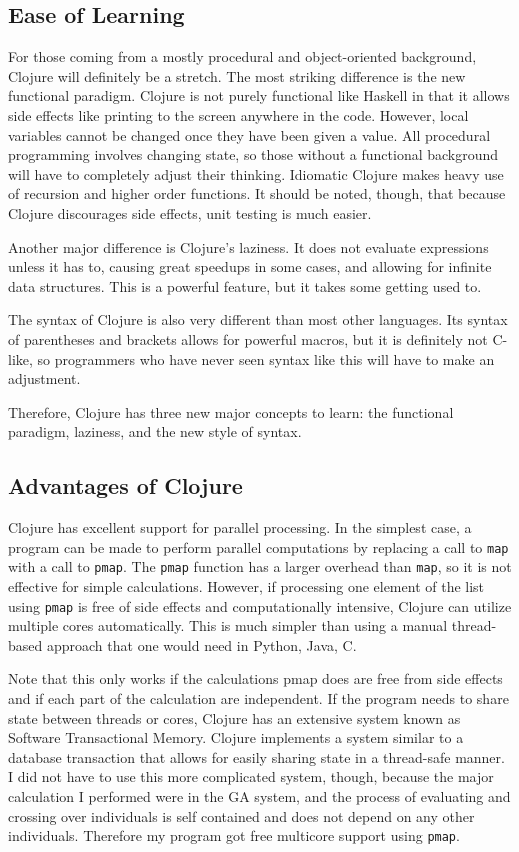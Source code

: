 \documentclass{article}
\begin{document}
\subsection{Ease of Learning}

For those coming from a mostly procedural and object-oriented background,
Clojure will definitely be a stretch.  The most striking difference is the new
functional paradigm.  Clojure is not purely functional like Haskell in that it
allows side effects like printing to the screen anywhere in the code.  However,
local variables cannot be changed once they have been given a value.  All
procedural programming involves changing state, so those without a functional
background will have to completely adjust their thinking.  Idiomatic Clojure
makes heavy use of recursion and higher order functions.  It should be noted,
though, that because Clojure discourages side effects, unit testing is much
easier.

Another major difference is Clojure's laziness.  It does not evaluate
expressions unless it has to, causing great speedups in some cases, and allowing
for infinite data structures.  This is a powerful feature, but it takes some
getting used to.  

The syntax of Clojure is also very different than most other languages.  Its
syntax of parentheses and brackets allows for powerful macros, but it is
definitely not C-like, so programmers who have never seen syntax like this will
have to make an adjustment.

Therefore, Clojure has three new major concepts to learn: the functional
paradigm, laziness, and the new style of syntax.

\subsection{Advantages  of Clojure}

Clojure has excellent support for parallel processing.  In the simplest case, a
program can be made to perform parallel computations by replacing a call to
\texttt{map} with a call to \texttt{pmap}.  The \texttt{pmap} function has a
larger overhead than \texttt{map}, so it is not effective for simple
calculations.  However, if processing one element of the list using
\texttt{pmap} is free of side effects and computationally intensive, Clojure can
utilize multiple cores automatically.  This is much simpler than using a manual
thread-based approach that one would need in Python, Java, C.

Note that this only works if the calculations pmap does are free from side
effects and if each part of the calculation are independent.  If the program
needs to share state between threads or cores, Clojure has an extensive system
known as Software Transactional Memory.  Clojure implements a system similar to
a database transaction that allows for easily sharing state in a thread-safe
manner.  I did not have to use this more complicated system, though, because
the major calculation I performed were in the GA system, and the process of
evaluating and crossing over individuals is self contained and does not depend
on any other individuals.  Therefore my program got free multicore support
using \texttt{pmap}.
\end{document}
